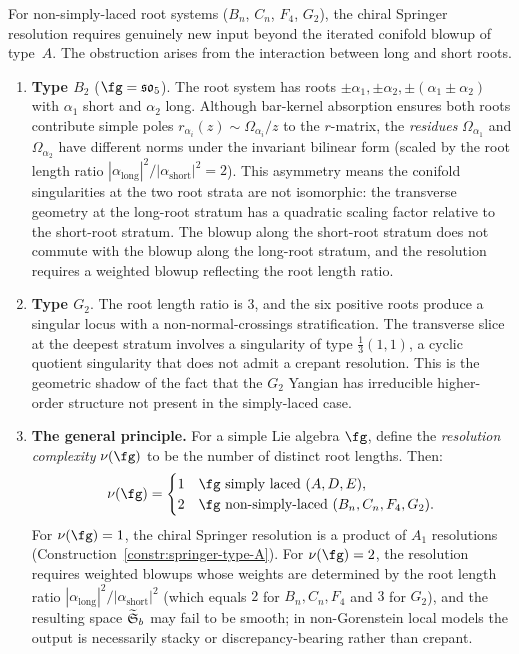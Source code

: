 \begin{conjecture}
\label{conj:beyond-type-A}
For non-simply-laced root systems ($B_n$, $C_n$, $F_4$, $G_2$),
the chiral Springer resolution requires genuinely new input beyond
the iterated conifold blowup of type~$A$. The obstruction arises
from the interaction between long and short roots.
\begin{enumerate}[label=\textup{(\alph*)}]
\item \textbf{Type $B_2$} ($\fg = \fso_5$).
 The root system has roots $\pm\alpha_1, \pm\alpha_2,
 \pm(\alpha_1 \pm \alpha_2)$ with $\alpha_1$ short and $\alpha_2$
 long. Although bar-kernel absorption ensures both roots contribute simple poles
 $r_{\alpha_i}(z) \sim \Omega_{\alpha_i}/z$ to the $r$-matrix, the
 \emph{residues} $\Omega_{\alpha_1}$ and $\Omega_{\alpha_2}$ have
 different norms under the invariant bilinear form (scaled by the
 root length ratio
 $|\alpha_{\mathrm{long}}|^2/|\alpha_{\mathrm{short}}|^2 = 2$).
 This asymmetry means the conifold singularities at the two root strata
 are not isomorphic: the transverse geometry at the long-root
 stratum has a quadratic scaling factor relative to the short-root
 stratum. The blowup along the short-root stratum does not commute
 with the blowup along the long-root stratum, and the resolution
 requires a weighted blowup reflecting the root length ratio.

\item \textbf{Type $G_2$}.
 The root length ratio is $3$, and the six positive roots
 produce a singular locus with a non-normal-crossings stratification.
 The transverse slice at the deepest stratum involves a singularity
 of type $\tfrac{1}{3}(1,1)$, a cyclic quotient singularity that
 does not admit a crepant resolution. This is the geometric shadow
 of the fact that the $G_2$ Yangian has irreducible higher-order
 structure not present in the simply-laced case.

\item \textbf{The general principle.}
 For a simple Lie algebra $\fg$, define the
 \emph{resolution complexity} $\nu(\fg)$ to be the number of
 distinct root lengths. Then:
 \[
 \nu(\fg) = \begin{cases}
 1 & \fg \text{ simply laced } (A, D, E), \\
 2 & \fg \text{ non-simply-laced } (B_n, C_n, F_4, G_2).
 \end{cases}
 \]
 For $\nu(\fg) = 1$, the chiral Springer resolution is a product of
 $A_1$ resolutions (Construction~\ref{constr:springer-type-A}).
 For $\nu(\fg) = 2$, the resolution requires weighted blowups
 whose weights are determined by the root length ratio
 $|\alpha_{\mathrm{long}}|^2/|\alpha_{\mathrm{short}}|^2$
 (which equals $2$ for $B_n, C_n, F_4$ and $3$ for $G_2$),
 and the resulting space $\widetilde{\mathfrak{S}}_b$ may fail to
 be smooth; in non-Gorenstein local models the output is necessarily
 stacky or discrepancy-bearing rather than crepant.
\end{enumerate}
\end{conjecture}

